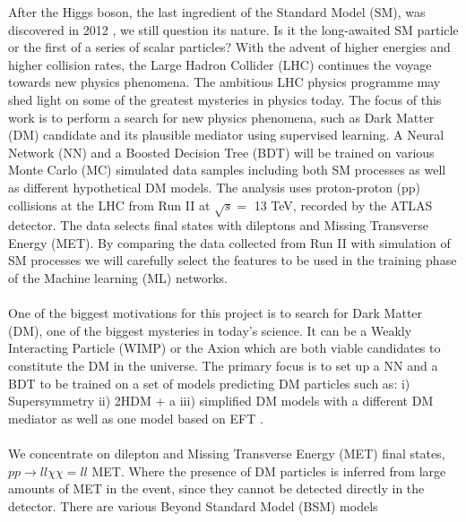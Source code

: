 \documentclass[12pt, a4paper]{book}
\begin{document}
After the Higgs boson, the last ingredient of the Standard Model (SM), was discovered in 2012 \cite{Higgs_discovery_2012}, we still question its nature. Is it the long-awaited SM particle or the first of a series of scalar particles? 
With the advent of higher energies and higher collision rates, the Large Hadron Collider (LHC) continues the voyage towards new physics phenomena. The ambitious LHC physics programme may shed light on some of the greatest mysteries in physics today. 
The focus of this work is to perform a search for new physics phenomena, such as Dark Matter (DM) candidate and its plausible mediator using supervised learning. A Neural Network (NN) and a Boosted Decision Tree (BDT) will 
be trained on various Monte Carlo (MC) simulated data samples including both SM processes as well as different hypothetical DM models. The analysis uses proton-proton (pp) collisions at the LHC from Run II at $\sqrt{s}=$ 13 TeV, recorded by the ATLAS detector. 
The data selects final states with dileptons and Missing Transverse Energy (MET). By comparing the data collected from Run II with simulation of SM processes we will carefully select the features to be used in the training phase of the Machine learning 
(ML) networks. \\
\\ One of the biggest motivations for this project is to search for Dark Matter (DM), one of the biggest mysteries in today's science. It can be a Weakly Interacting Particle (WIMP) \cite{WIMP} or the Axion \cite{Axion} which are both viable candidates to constitute the DM in the universe. 
The primary focus is to set up a NN and a BDT to be trained on a set of models predicting DM particles such as: i) Supersymmetry \cite{JUNGMAN1996195} ii) 2HDM + a \cite{article} iii) simplified DM models with a different DM mediator as well as one model based on EFT \cite{Zp_DM_candidate2}.\\
\\ We concentrate on dilepton and Missing Transverse Energy (MET) final states, $pp\rightarrow ll \chi\chi = ll$ MET. Where the presence of DM particles is inferred from large amounts of MET in the event, since they cannot be detected directly in the detector. There are various Beyond Standard Model (BSM) models 
\end{document}

